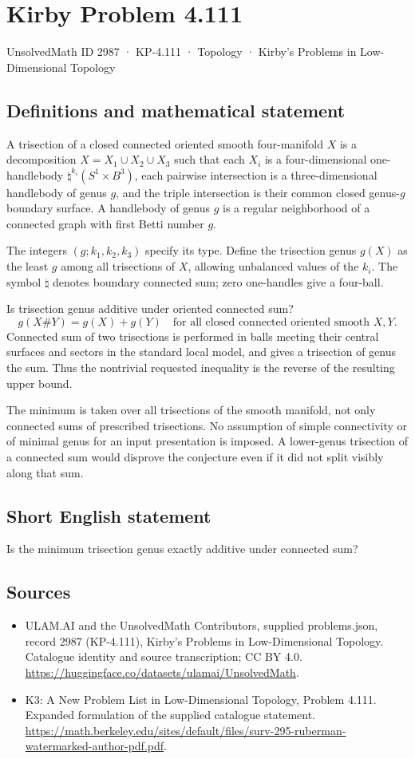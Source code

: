 \documentclass[11pt,a4paper]{article}
\begin{document}
\section*{Kirby Problem 4.111}\label{2987}
{\small UnsolvedMath ID 2987 · KP-4.111 · Topology · Kirby's Problems in Low-Dimensional Topology}
\subsection{Definitions and mathematical statement}
A trisection of a closed connected oriented smooth four-manifold $X$ is a decomposition $X=X_1\cup X_2\cup X_3$ such that each $X_i$ is a four-dimensional one-handlebody $\natural^{k_i}(S^1\times B^3)$, each pairwise intersection is a three-dimensional handlebody of genus $g$, and the triple intersection is their common closed genus-$g$ boundary surface. A handlebody of genus $g$ is a regular neighborhood of a connected graph with first Betti number $g$.

The integers $(g;k_1,k_2,k_3)$ specify its type. Define the trisection genus $g(X)$ as the least $g$ among all trisections of $X$, allowing unbalanced values of the $k_i$. The symbol $\natural$ denotes boundary connected sum; zero one-handles give a four-ball.

Is trisection genus additive under oriented connected sum?
\[
g(X\#Y)=g(X)+g(Y)
\quad\text{for all closed connected oriented smooth }X,Y.
\]
Connected sum of two trisections is performed in balls meeting their central surfaces and sectors in the standard local model, and gives a trisection of genus the sum. Thus the nontrivial requested inequality is the reverse of the resulting upper bound.

The minimum is taken over all trisections of the smooth manifold, not only connected sums of prescribed trisections. No assumption of simple connectivity or of minimal genus for an input presentation is imposed. A lower-genus trisection of a connected sum would disprove the conjecture even if it did not split visibly along that sum.
\subsection{Short English statement}
Is the minimum trisection genus exactly additive under connected sum?
\subsection{Sources}
\begin{itemize}
\item[S1] ULAM.AI and the UnsolvedMath Contributors, supplied problems.json, record 2987 (KP-4.111), Kirby's Problems in Low-Dimensional Topology. Catalogue identity and source transcription; CC BY 4.0.
\url{https://huggingface.co/datasets/ulamai/UnsolvedMath}.
\item[S2] K3: A New Problem List in Low-Dimensional Topology, Problem 4.111. Expanded formulation of the supplied catalogue statement.
\url{https://math.berkeley.edu/sites/default/files/surv-295-ruberman-watermarked-author-pdf.pdf}.
\end{itemize}
\end{document}
